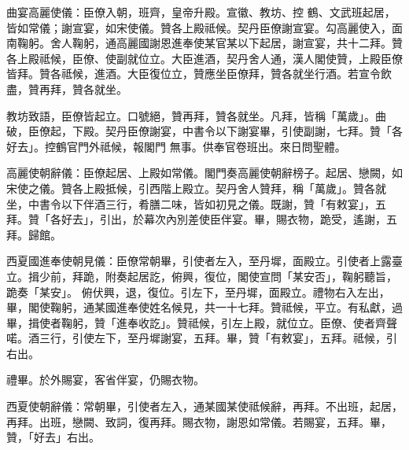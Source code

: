 \begin{pinyinscope}
 曲宴高麗使儀：臣僚入朝，班齊，皇帝升殿。宣徽、教坊、控
 鶴、文武班起居，皆如常儀；謝宣宴，如宋使儀。贊各上殿祗候。契丹臣僚謝宣宴。勾高麗使入，面南鞠躬。舍人鞠躬，通高麗國謝恩進奉使某官某以下起居，謝宣宴，共十二拜。贊各上殿祗候，臣僚、使副就位立。大臣進酒，契丹舍人通，漢人閣使贊，上殿臣僚皆拜。贊各祗候，進酒。大臣復位立，贊應坐臣僚拜，贊各就坐行酒。若宣令飲盡，贊再拜，贊各就坐。



 教坊致語，臣僚皆起立。口號絕，贊再拜，贊各就坐。凡拜，皆稱「萬歲」。曲破，臣僚起，下殿。契丹臣僚謝宴，中書令以下謝宴畢，引使副謝，七拜。贊「各好去」。控鶴官門外祗候，報閣門
 無事。供奉官卷班出。來日問聖體。



 高麗使朝辭儀：臣僚起居、上殿如常儀。閣門奏高麗使朝辭榜子。起居、戀闕，如宋使之儀。贊各上殿抵候，引西階上殿立。契丹舍人贊拜，稱「萬歲」。贊各就坐，中書令以下伴酒三行，肴膳二味，皆如初見之儀。既謝，贊「有敕宴」，五拜。贊「各好去」，引出，於幕次內別差使臣伴宴。畢，賜衣物，跪受，遙謝，五拜。歸館。



 西夏國進奉使朝見儀：臣僚常朝畢，引使者左入，至丹墀，面殿立。引使者上露臺立。揖少前，拜跪，附奏起居訖，俯興，復位，閣使宣問「某安否」，鞠躬聽旨，跪奏「某安」。
 俯伏興，退，復位。引左下，至丹墀，面殿立。禮物右入左出，畢，閣使鞠躬，通某國進奉使姓名候見，共一十七拜。贊祗候，平立。有私獻，過畢，揖使者鞠躬，贊「進奉收訖」。贊祗候，引左上殿，就位立。臣僚、使者齊聲喏。酒三行，引使左下，至丹墀謝宴，五拜。畢，贊「有敕宴」，五拜。祗候，引右出。



 禮畢。於外賜宴，客省伴宴，仍賜衣物。



 西夏使朝辭儀：常朝畢，引使者左入，通某國某使祗候辭，再拜。不出班，起居，再拜。出班，戀闕、致詞，復再拜。賜衣物，謝恩如常儀。若賜宴，五拜。畢，贊，「好去」右出。



\end{pinyinscope}